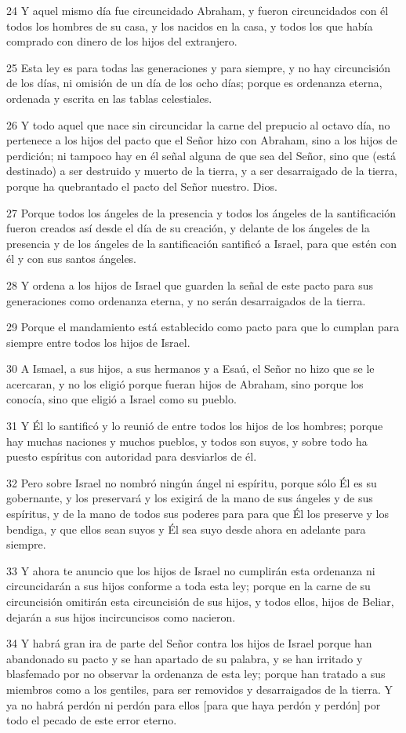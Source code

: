 \par 24 Y aquel mismo día fue circuncidado Abraham, y fueron circuncidados con él todos los hombres de su casa, y los nacidos en la casa, y todos los que había comprado con dinero de los hijos del extranjero.
\par 25 Esta ley es para todas las generaciones y para siempre, y no hay circuncisión de los días, ni omisión de un día de los ocho días; porque es ordenanza eterna, ordenada y escrita en las tablas celestiales.
\par 26 Y todo aquel que nace sin circuncidar la carne del prepucio al octavo día, no pertenece a los hijos del pacto que el Señor hizo con Abraham, sino a los hijos de perdición; ni tampoco hay en él señal alguna de que sea del Señor, sino que (está destinado) a ser destruido y muerto de la tierra, y a ser desarraigado de la tierra, porque ha quebrantado el pacto del Señor nuestro. Dios.
\par 27 Porque todos los ángeles de la presencia y todos los ángeles de la santificación fueron creados así desde el día de su creación, y delante de los ángeles de la presencia y de los ángeles de la santificación santificó a Israel, para que estén con él y con sus santos ángeles.
\par 28 Y ordena a los hijos de Israel que guarden la señal de este pacto para sus generaciones como ordenanza eterna, y no serán desarraigados de la tierra.
\par 29 Porque el mandamiento está establecido como pacto para que lo cumplan para siempre entre todos los hijos de Israel.
\par 30 A Ismael, a sus hijos, a sus hermanos y a Esaú, el Señor no hizo que se le acercaran, y no los eligió porque fueran hijos de Abraham, sino porque los conocía, sino que eligió a Israel como su pueblo.
\par 31 Y Él lo santificó y lo reunió de entre todos los hijos de los hombres; porque hay muchas naciones y muchos pueblos, y todos son suyos, y sobre todo ha puesto espíritus con autoridad para desviarlos de él.
\par 32 Pero sobre Israel no nombró ningún ángel ni espíritu, porque sólo Él es su gobernante, y los preservará y los exigirá de la mano de sus ángeles y de sus espíritus, y de la mano de todos sus poderes para para que Él los preserve y los bendiga, y que ellos sean suyos y Él sea suyo desde ahora en adelante para siempre.
\par 33 Y ahora te anuncio que los hijos de Israel no cumplirán esta ordenanza ni circuncidarán a sus hijos conforme a toda esta ley; porque en la carne de su circuncisión omitirán esta circuncisión de sus hijos, y todos ellos, hijos de Beliar, dejarán a sus hijos incircuncisos como nacieron.
\par 34 Y habrá gran ira de parte del Señor contra los hijos de Israel porque han abandonado su pacto y se han apartado de su palabra, y se han irritado y blasfemado por no observar la ordenanza de esta ley; porque han tratado a sus miembros como a los gentiles, para ser removidos y desarraigados de la tierra. Y ya no habrá perdón ni perdón para ellos [para que haya perdón y perdón] por todo el pecado de este error eterno.

